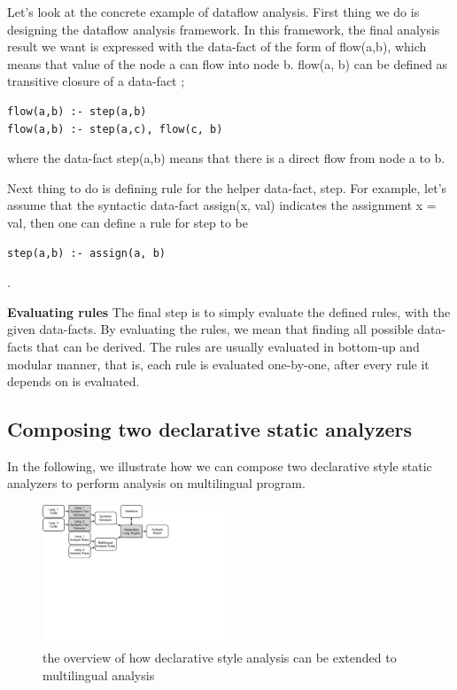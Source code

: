 Let's look at the concrete example of dataflow analysis. First thing we do is
designing the dataflow analysis framework.  In this framework, the final
analysis result we want is expressed with the data-fact of the form of
flow(a,b), which means that value of the node a can flow into node b. flow(a,
b) can be defined as transitive closure of a data-fact ;

\begin{lstlisting}[style=myDatalog,xleftmargin=2.5em]
flow(a,b) :- step(a,b)
flow(a,b) :- step(a,c), flow(c, b)
\end{lstlisting}
where the data-fact step(a,b) means that there is a direct flow from node a to b.

Next thing to do is defining rule for the helper data-fact, step.  For example,
let's assume that the syntactic data-fact assign(x, val) indicates the assignment
x = val, then one can define a rule for step to be
\begin{lstlisting}[style=myDatalog,xleftmargin=2.5em]
step(a,b) :- assign(a, b)
\end{lstlisting}
.


\textbf{Evaluating rules}
The final step is to simply evaluate the defined rules, with the given
data-facts.  By evaluating the rules, we mean that finding all possible
data-facts that can be derived. The rules are usually evaluated in bottom-up
and modular manner, that is, each rule is evaluated one-by-one, after every
rule it depends on is evaluated.

\subsection{Composing two declarative static analyzers}

In the following, we illustrate how we can compose two declarative style static analyzers
to perform analysis on multilingual program.

\begin{figure}[t]
  \centering
  \vspace{2mm}
  \includegraphics[width=0.5\textwidth]{img/overview2}
  \vspace*{-1.5em}
  \caption{the overview of how declarative style analysis can be
  extended to multilingual analysis}
  \label{fig:overview2}
\vspace*{-.5em}
\end{figure}

